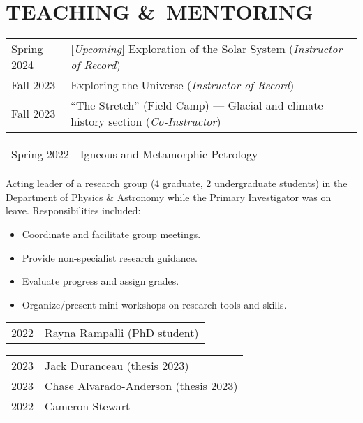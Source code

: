 \section*{TEACHING \&\ MENTORING}
\begin{tabular}{p{.15\linewidth} p{.85\linewidth}} %
	Spring 2024 & [\emph{Upcoming}] Exploration of the Solar System (\emph{Instructor of Record})\\
	Fall 2023 & Exploring the Universe (\emph{Instructor of Record})\\
	Fall 2023 & ``The Stretch'' (Field Camp) --- Glacial and climate history section (\emph{Co-Instructor})\\
	\end{tabular}

\begin{tabular}{p{.15\linewidth} p{.85\linewidth}} %

	Spring 2022 & Igneous and Metamorphic Petrology
\end{tabular}

Acting leader of a research group (4 graduate, 2 undergraduate students) in the Department of Physics \& Astronomy while the Primary Investigator was on leave. Responsibilities included:
\begin{itemize}
\item Coordinate and facilitate group meetings.
\item Provide non-specialist research guidance.
\item Evaluate progress and assign grades.
\item Organize/present mini-workshops on research tools and skills.
\end{itemize}

\begin{tabular}{ll}
	2022\ongoing & Rayna Rampalli (PhD student)\\
\end{tabular}
\begin{tabular}{ll}
	2023 & Jack Duranceau (thesis 2023)\\
	2023 & Chase Alvarado-Anderson (thesis 2023)\\
	2022 & Cameron Stewart \\
\end{tabular}

